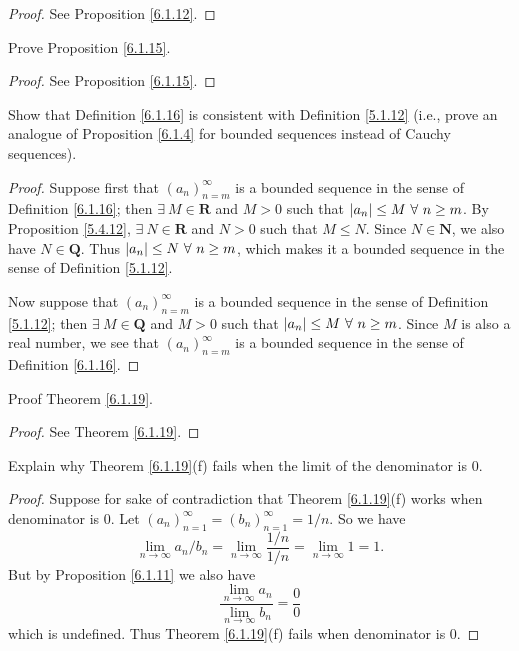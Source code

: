 \begin{proof}
See Proposition \ref{6.1.12}.
\end{proof}

\begin{exercise}\label{ex 6.1.6}
Prove Proposition \ref{6.1.15}.
\end{exercise}

\begin{proof}
See Proposition \ref{6.1.15}.
\end{proof}

\begin{exercise}\label{ex 6.1.7}
Show that Definition \ref{6.1.16} is consistent with Definition \ref{5.1.12}
(i.e., prove an analogue of Proposition \ref{6.1.4} for bounded sequences instead of Cauchy sequences).
\end{exercise}

\begin{proof}
Suppose first that \((a_n)_{n = m}^\infty\) is a bounded sequence in the sense of Definition \ref{6.1.16};
then \(\exists\ M \in \mathbf{R}\) and \(M > 0\) such that \(\abs*{a_n} \leq M \ \forall\ n \geq m\).
By Proposition \ref{5.4.12}, \(\exists\ N \in \mathbf{R}\) and \(N > 0\) such that \(M \leq N\).
Since \(N \in \mathbf{N}\), we also have \(N \in \mathbf{Q}\).
Thus \(\abs*{a_n} \leq N \ \forall\ n \geq m\), which makes it a bounded sequence in the sense of Definition \ref{5.1.12}.

Now suppose that \((a_n)_{n = m}^\infty\) is a bounded sequence in the sense of Definition \ref{5.1.12};
then \(\exists\ M \in \mathbf{Q}\) and \(M > 0\) such that \(\abs*{a_n} \leq M \ \forall\ n \geq m\).
Since \(M\) is also a real number, we see that \((a_n)_{n = m}^\infty\) is a bounded sequence in the sense of Definition \ref{6.1.16}.
\end{proof}

\begin{exercise}\label{ex 6.1.8}
Proof Theorem \ref{6.1.19}.
\end{exercise}

\begin{proof}
See Theorem \ref{6.1.19}.
\end{proof}

\begin{exercise}\label{ex 6.1.9}
Explain why Theorem \ref{6.1.19}(f) fails when the limit of the denominator is \(0\).
\end{exercise}

\begin{proof}
Suppose for sake of contradiction that Theorem \ref{6.1.19}(f) works when denominator is \(0\).
Let \((a_n)_{n = 1}^\infty = (b_n)_{n = 1}^\infty = 1 / n\).
So we have
\[
    \lim_{n \to \infty} a_n / b_n = \lim_{n \to \infty} \frac{1 / n}{1 / n} = \lim_{n \to \infty} 1 = 1.
\]
But by Proposition \ref{6.1.11} we also have
\[
    \frac{\lim_{n \to \infty} a_n}{\lim_{n \to \infty} b_n} = \frac{0}{0}
\]
which is undefined.
Thus Theorem \ref{6.1.19}(f) fails when denominator is \(0\).
\end{proof}

